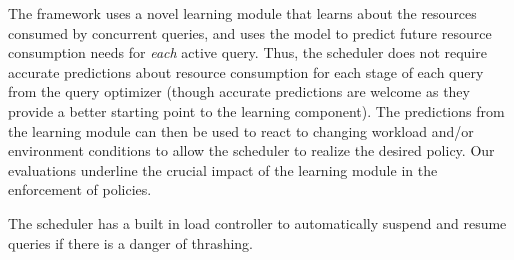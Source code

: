 The framework uses a novel learning module that learns about the resources consumed by concurrent queries, and uses the model to predict future resource consumption needs for \textit{each} active query. 
Thus, the scheduler does not require accurate predictions about resource consumption for each stage of each query from the query optimizer (though accurate predictions are welcome as they provide a better starting point to the learning component). 
The predictions from the learning module can then be used to react to changing workload and/or environment conditions to allow the scheduler to realize the desired policy. 
Our evaluations underline the crucial impact of the learning module in the enforcement of policies.

The scheduler has a built in load controller to automatically suspend and resume queries if there is a danger of thrashing.
%

